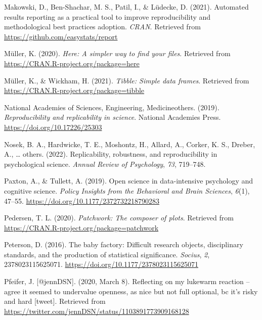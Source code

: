 \documentclass[
  english,
  man,floatsintext]{apa6}
\newlength{\cslhangindent}
\newlength{\cslentryspacingunit} %
\newenvironment{CSLReferences}[2] %
 {%
  \setlength{\parindent}{0pt}
  \ifodd #1
  \let\oldpar\par
  \def\par{\hangindent=\cslhangindent\oldpar}
  \fi
  \setlength{\parskip}{#2\cslentryspacingunit}
 }%
 {}
\begin{document}
\begin{CSLReferences}{1}{0}
\leavevmode{}%
Makowski, D., Ben-Shachar, M. S., Patil, I., \& Lüdecke, D. (2021). Automated results reporting as a practical tool to improve reproducibility and methodological best practices adoption. \emph{CRAN}. Retrieved from \url{https://github.com/easystats/report}

\leavevmode{}%
Müller, K. (2020). \emph{Here: A simpler way to find your files}. Retrieved from \url{https://CRAN.R-project.org/package=here}

\leavevmode{}%
Müller, K., \& Wickham, H. (2021). \emph{Tibble: Simple data frames}. Retrieved from \url{https://CRAN.R-project.org/package=tibble}

\leavevmode{}%
National Academies of Sciences, Engineering, Medicineothers. (2019). \emph{Reproducibility and replicability in science}. National Academies Press. \url{https://doi.org/10.17226/25303}

\leavevmode{}%
Nosek, B. A., Hardwicke, T. E., Moshontz, H., Allard, A., Corker, K. S., Dreber, A., \ldots{} others. (2022). Replicability, robustness, and reproducibility in psychological science. \emph{Annual Review of Psychology}, \emph{73}, 719--748.

\leavevmode{}%
Paxton, A., \& Tullett, A. (2019). Open science in data-intensive psychology and cognitive science. \emph{Policy Insights from the Behavioral and Brain Sciences}, \emph{6}(1), 47--55. \url{https://doi.org/10.1177/2372732218790283}

\leavevmode{}%
Pedersen, T. L. (2020). \emph{Patchwork: The composer of plots}. Retrieved from \url{https://CRAN.R-project.org/package=patchwork}

\leavevmode{}%
Peterson, D. (2016). The baby factory: Difficult research objects, disciplinary standards, and the production of statistical significance. \emph{Socius}, \emph{2}, 2378023115625071. \url{https://doi.org/10.1177/2378023115625071}

\leavevmode{}%
Pfeifer, J. {[}@jennDSN{]}. (2020, March 8). Reflecting on my lukewarm reaction -- agree it seemed to undervalue openness, as nice but not full optional, bc it's risky and hard {[}tweet{]}. Retrieved from \url{https://twitter.com/jennDSN/status/1103891773909168128}


\end{CSLReferences}
\end{document}
